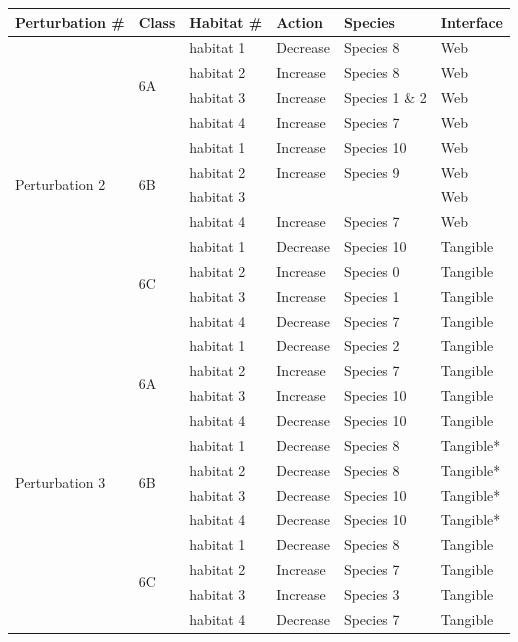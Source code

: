 \begin{table}
\centering
\begin{tabular}{ | l | l | l | l | l | l | }
\hline
Perturbation \# & Class  & Habitat \# & Action & Species & Interface \\
\hline
\hline
\multirow{12}{*}{Perturbation 2} & \multirow{4}{*}{6A} & habitat 1 & Decrease  & Species 8 & Web \\
 & & habitat 2 & Increase & Species 8 & Web \\
 & & habitat 3 & Increase & Species 1 \& 2 & Web \\
 & & habitat 4 & Increase & Species 7 & Web \\
\cline{2-6}
 & \multirow{4}{*}{6B} & habitat 1 & Increase & Species 10 & Web \\
 & & habitat 2 & Increase & Species 9 & Web \\
 & & habitat 3 & & & Web \\
 & & habitat 4 & Increase & Species 7 & Web \\
\cline{2-6}
 & \multirow{4}{*}{6C} & habitat 1 & Decrease & Species 10 & Tangible \\
 & & habitat 2 & Increase & Species 0 & Tangible \\
 & & habitat 3 & Increase & Species 1 & Tangible \\
 & & habitat 4 & Decrease & Species 7 & Tangible \\ 
\hline
\multirow{12}{*}{Perturbation 3} & \multirow{4}{*}{6A} & habitat 1 & Decrease & Species 2 & Tangible \\
 & & habitat 2 & Increase & Species 7  & Tangible \\
 & & habitat 3 & Increase & Species 10 & Tangible \\
 & & habitat 4 & Decrease & Species 10 & Tangible \\
\cline{2-6}
 & \multirow{4}{*}{6B} & habitat 1 & Decrease & Species 8 & Tangible* \\
 & & habitat 2 & Decrease & Species 8  & Tangible* \\
 & & habitat 3 & Decrease & Species 10 & Tangible* \\
 & & habitat 4 & Decrease & Species 10 & Tangible* \\
\cline{2-6}
 & \multirow{4}{*}{6C} & habitat 1 & Decrease & Species 8 & Tangible \\
 & & habitat 2 & Increase & Species 7 & Tangible \\
 & & habitat 3 & Increase & Species 3 & Tangible \\
 & & habitat 4 & Decrease & Species 7 & Tangible \\ 

\end{tabular}
\end{table}
